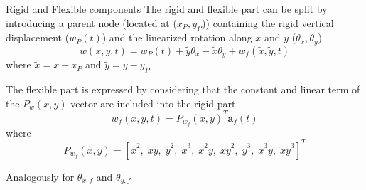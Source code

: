 \documentclass{beamer}
\begin{document}
\begin{frame}{Rigid and Flexible components}
The rigid and flexible part can be split by introducing a parent node (located at ($x_P, y_P$)) containing the rigid vertical displacement ($w_P(t)$) and the linearized rotation along $x$ and $y$ ($\theta_x, \theta_y$)
\begin{equation*}
w(x,y,t) = w_P(t) + \widetilde{y} \theta_x - \widetilde{x} \theta_y + w_f(\widetilde{x}, \widetilde{y}, t)
\end{equation*}
where $\widetilde{x} = x - x_P$ and $\widetilde{y} = y - y_P$

The flexible part is expressed by considering that the constant and linear term of the $P_w(x,y)$ vector are included into the rigid part 
\begin{equation*}
w_f(x,y,t) = P_{w_f}(\widetilde{x}, \widetilde{y})^T \bm{a}_f(t)
\end{equation*}
where
\begin{equation*}
P_{w_f}(\widetilde{x}, \widetilde{y}) = [\widetilde{x}^2, \; \widetilde{x}\widetilde{y}, \; \widetilde{y}^2, \; \widetilde{x}^3, \; \widetilde{x}^2 \widetilde{y} , \; \widetilde{x} \widetilde{y}^2 , \; \widetilde{y}^3 , \; \widetilde{x}^3 \widetilde{y} , \; \widetilde{x} \widetilde{y}^3]^T 
\end{equation*}

Analogously for $\theta_{x, f}$ and $\theta_{y, f}$ 

\end{frame}
\end{document}
